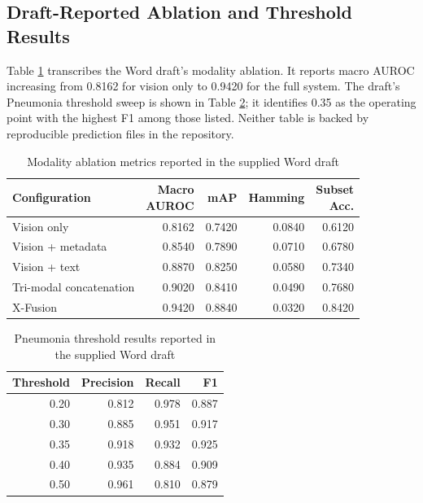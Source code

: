 \documentclass[conference,letterpaper]{IEEEtran}
\begin{document}
\subsection{Draft-Reported Ablation and Threshold Results}

Table \ref{tab:ablation-results} transcribes the Word draft's modality ablation. It reports macro AUROC increasing from 0.8162 for vision only to 0.9420 for the full system. The draft's Pneumonia threshold sweep is shown in Table \ref{tab:threshold-results}; it identifies 0.35 as the operating point with the highest F1 among those listed. Neither table is backed by reproducible prediction files in the repository.

\begin{table}[t]\caption{Modality ablation metrics reported in the supplied Word draft}\label{tab:ablation-results}\centering\scriptsize\setlength{\tabcolsep}{2pt}\begin{tabular}{@{}p{}rrrr@{}}\toprule Configuration & \shortstack{Macro\\AUROC} & mAP & Hamming & \shortstack{Subset\\Acc.}\\\midrule Vision only & 0.8162 & 0.7420 & 0.0840 & 0.6120\\Vision + metadata & 0.8540 & 0.7890 & 0.0710 & 0.6780\\Vision + text & 0.8870 & 0.8250 & 0.0580 & 0.7340\\Tri-modal concatenation & 0.9020 & 0.8410 & 0.0490 & 0.7680\\X-Fusion & 0.9420 & 0.8840 & 0.0320 & 0.8420\\\bottomrule\end{tabular}\end{table}

\begin{table}[t]\caption{Pneumonia threshold results reported in the supplied Word draft}\label{tab:threshold-results}\centering\scriptsize\begin{tabular}{@{}rrrr@{}}\toprule Threshold & Precision & Recall & F1\\\midrule 0.20 & 0.812 & 0.978 & 0.887\\0.30 & 0.885 & 0.951 & 0.917\\0.35 & 0.918 & 0.932 & 0.925\\0.40 & 0.935 & 0.884 & 0.909\\0.50 & 0.961 & 0.810 & 0.879\\\bottomrule\end{tabular}\end{table}
\end{document}
